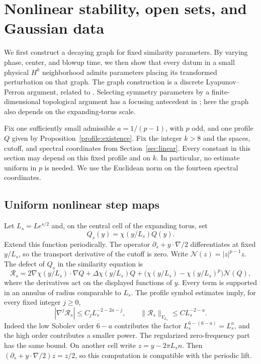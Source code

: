 \documentclass[11pt]{article}
\numberwithin{equation}{section}
\theoremstyle{definition}
\theoremstyle{remark}
\begin{document}
\section{Nonlinear stability, open sets, and Gaussian data}
\label{sec:nonlinear}

We first construct a decaying graph for fixed similarity parameters.
By varying phase, center, and blowup time, we then show that every datum
in a small physical $H^k$ neighborhood admits parameters placing its
transformed perturbation on that graph.
The graph construction is a discrete Lyapunov--Perron argument,
related to \cite[Proposition~4.8]{BuckEtAl2026}. Selecting symmetry
parameters by a finite-dimensional topological argument has a focusing
antecedent in \cite[Section~6.3]{Li2023}; here the graph also depends
on the expanding-torus scale.

Fix one sufficiently small admissible $a=1/(p-1)$, with $p$ odd, and one
profile $Q$ given by Proposition~\ref{profile:existence}. Fix the integer
$k>8$ and the spaces, cutoff, and spectral coordinates from
Section~\ref{sec:linear}. Every constant in this section may depend on this
fixed profile and on $k$. In particular, no estimate uniform in $p$ is needed.
We use the Euclidean norm on the fourteen spectral coordinates.

\subsection{Uniform nonlinear step maps}

Let $L_s=L e^{s/2}$ and, on the central cell of the expanding torus, set
\[
 Q_s(y)=\chi(y/L_s)Q(y).
\]
Extend this function periodically. The operator
$\partial_s+y\cdot\nabla/2$ differentiates at fixed $y/L_s$, so the
transport derivative of the cutoff is zero. Write
$\mathcal N(z)=|z|^{p-1}z$. The defect of $Q_s$ in the similarity equation is
\begin{equation}\label{nl:residual-formula}
 \mathcal R_s
 =2\nabla\chi(y/L_s)\cdot\nabla Q
   +\Delta\chi(y/L_s)Q
   +\bigl(\chi(y/L_s)-\chi(y/L_s)^p\bigr)\mathcal N(Q),
\end{equation}
where the derivatives act on the displayed functions of $y$.
Every term is supported in an annulus of radius comparable to $L_s$.
The profile symbol estimates imply, for every fixed integer $j\geq0$,
\[
 |\nabla^j\mathcal R_s|\leq C_j L_s^{-2-2a-j},
 \qquad
 \|\mathcal R_s\|_{Y_{L_s}}\leq C L_s^{-2-a}.
\]
Indeed the low Sobolev order $6-a$ contributes the factor
$L_s^{6-(6-a)}=L_s^a$, and the high order contributes a smaller power.
The regularized zero-frequency part has the same bound. On another cell
write $z=y-2\pi L_s n$. Then
$(\partial_s+y\cdot\nabla/2)z=z/2$, so this computation is compatible
with the periodic lift.
\end{document}
